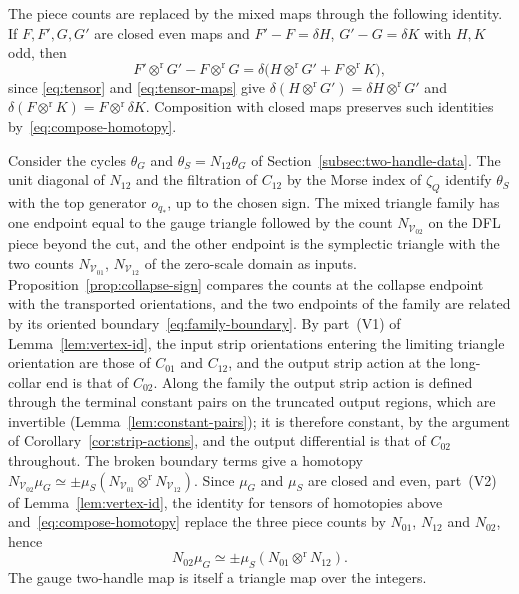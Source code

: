 \documentclass[11pt]{amsart}
\theoremstyle{definition}
\theoremstyle{remark}
\theoremstyle{plain}
\numberwithin{equation}{section}
\begin{document}
The piece counts are replaced by the mixed maps through the following
identity. If $F,F',G,G'$ are closed even maps and $F'-F=\delta H$,
$G'-G=\delta K$ with $H,K$ odd, then
\[
 F'\otimes^{\mathrm r}G'-F\otimes^{\mathrm r}G=\delta\bigl(H\otimes^{\mathrm r}G'+F\otimes^{\mathrm r}K\bigr),
\]
since \eqref{eq:tensor} and \eqref{eq:tensor-maps} give
$\delta(H\otimes^{\mathrm r}G')=\delta H\otimes^{\mathrm r}G'$ and
$\delta(F\otimes^{\mathrm r}K)=F\otimes^{\mathrm r}\delta K$. Composition with closed maps
preserves such identities by~\eqref{eq:compose-homotopy}.

Consider the cycles $\theta_G$ and $\theta_S=N_{12}\theta_G$ of
Section~\ref{subsec:two-handle-data}. The unit diagonal of $N_{12}$ and the
filtration of $C_{12}$ by the Morse index of $\zeta_Q$ identify $\theta_S$
with the top generator $o_{q_*}$, up to the chosen sign. The mixed triangle
family has one endpoint equal to the gauge triangle followed by the
count $N_{\mathcal V_{02}}$ on the DFL piece beyond the cut, and the other
endpoint is the symplectic triangle with the two counts
$N_{\mathcal V_{01}}$, $N_{\mathcal V_{12}}$ of the zero-scale domain as
inputs. Proposition~\ref{prop:collapse-sign} compares the
counts at the collapse endpoint with the transported orientations,
and the two endpoints of the family are related by its oriented
boundary~\eqref{eq:family-boundary}. By part~(V1) of Lemma~\ref{lem:vertex-id}, the input strip orientations entering the limiting triangle orientation are those of $C_{01}$ and $C_{12}$, and the output strip action at the long-collar end is that of $C_{02}$. Along the family the output strip action is defined through the terminal constant pairs on the truncated output regions, which are invertible (Lemma~\ref{lem:constant-pairs}); it is therefore constant, by the argument of Corollary~\ref{cor:strip-actions}, and the output differential is that of $C_{02}$ throughout. The broken
boundary terms give a homotopy
$N_{\mathcal V_{02}}\mu_G\simeq\pm\mu_S(N_{\mathcal V_{01}}\otimes^{\mathrm r}
N_{\mathcal V_{12}})$. Since $\mu_G$ and $\mu_S$ are closed and even,
part~(V2) of Lemma~\ref{lem:vertex-id}, the identity for tensors of homotopies above
and~\eqref{eq:compose-homotopy} replace the three piece counts by
$N_{01}$, $N_{12}$ and $N_{02}$, hence
\begin{equation}\label{eq:triangle-square}
 N_{02}\mu_G\simeq
 \pm\mu_S(N_{01}\otimes^{\mathrm r} N_{12}).
\end{equation}
The gauge two-handle map is itself a triangle map over the integers.
\end{document}
